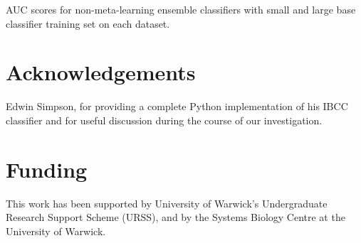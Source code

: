 \documentclass{bioinfo}
\begin{document}
\clearpage

\begin{table}[t]
\caption{AUC scores for non-meta-learning ensemble classifiers with small and large base classifier training set on each dataset.}
\label{fig:06}
\end{table}

\clearpage

\section*{Acknowledgements}

Edwin Simpson, for providing a complete Python implementation of his IBCC classifier and for useful discussion during the course of our investigation.

\section*{Funding}

This work has been supported by University of Warwick's Undergraduate Research Support Scheme (URSS), and by the Systems Biology Centre at the University of Warwick.

%
%
%
%
%
%
%
%
%
\end{document}
